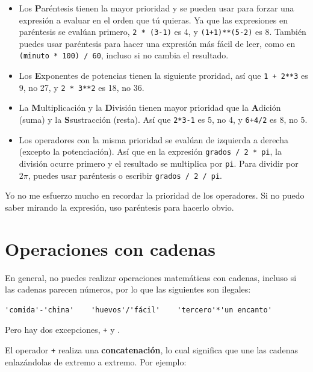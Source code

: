 \documentclass[10pt]{book}
\begin{document}
\begin{itemize}

\item Los {\bf P}aréntesis tienen la mayor prioridad y se pueden usar 
para forzar una expresión a evaluar en el orden que tú quieras. Ya que
las expresiones en paréntesis se evalúan primero, {\tt 2 * (3-1)} es 4,
y {\tt (1+1)**(5-2)} es 8. También puedes usar paréntesis para hacer una
expresión más fácil de leer, como en {\tt (minuto * 100) / 60}, incluso
si no cambia el resultado.

\item Los {\bf E}xponentes de potencias tienen la siguiente proridad, así que
{\tt 1 + 2**3} es 9, no 27, y {\tt 2 * 3**2} es 18, no 36.

\item La {\bf M}ultiplicación y la {\bf D}ivisión tienen mayor prioridad
	que la {\bf A}dición (suma) y la {\bf S}sustracción (resta).  Así que {\tt 2*3-1} es 5, no
  4, y {\tt 6+4/2} es 8, no 5.

\item Los operadores con la misma prioridad se evalúan de izquierda a
  derecha (excepto la potenciación).  Así que en la expresión {\tt grados /
    2 * pi}, la división ocurre primero y el resultado se multiplica
  por {\tt pi}.  Para dividir por $2 \pi$, puedes usar paréntesis o escribir
  {\tt grados / 2 / pi}.

\end{itemize}

Yo no me esfuerzo mucho en recordar la prioridad de los
operadores. Si no puedo saber mirando la expresión, uso
paréntesis para hacerlo obvio.


\section{Operaciones con cadenas}

En general, no puedes realizar operaciones matemáticas con cadenas, incluso
si las cadenas parecen números, por lo que las siguientes son ilegales:

\begin{verbatim}
'comida'-'china'    'huevos'/'fácil'    'tercero'*'un encanto'
\end{verbatim}
%
Pero hay dos excepciones, {\tt +} y {\tt *}.

El operador {\tt +} realiza una {\bf concatenación}, lo cual significa que
une las cadenas enlazándolas de extremo a extremo.  Por ejemplo:
\end{document}
